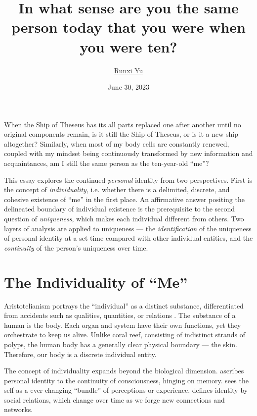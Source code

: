\documentclass[a4paper,english,12pt]{scrartcl}
\begin{document}
\subject{2023 John Locke Essay Competition\\Philosophy Question 2}
\title{In what sense are you the same person today that you were when you were ten?}
\author{\href{https://www.andrewyu.org/}{Runxi Yu}}
\date{June 30, 2023}

\maketitle

\noindent When the Ship of Theseus has its all parts replaced one
after another until no original components remain, is it still the
Ship of Theseus, or is it a new ship altogether?  Similarly, when
most of my body cells are constantly renewed, coupled with my mindset
being continuously transformed by new information and acquaintances,
am I still the same person as the ten-year-old ``me''?

This essay explores the continued \emph{personal} identity from two
perspectives. First is the concept of \emph{individuality}, i.e. whether
there is a delimited, discrete, and cohesive existence of ``me''
in the first place. An affirmative answer positing the delineated
boundary of individual existence is the prerequisite to the second
question of \emph{uniqueness}, which makes each individual different
from others. Two layers of analysis are applied to uniqueness
--- the \emph{identification} of the uniqueness of personal identity
at a set time compared with other individual entities, and the \emph{continuity}
of the person's uniqueness over time.

\section{The Individuality of ``Me''}

Aristotelianism portrays the ``individual'' as a distinct substance,
differentiated from accidents such as qualities, quantities, or relations
\parencite{MetaphysicsZeta}. The substance of a human is the body.
Each organ and system have their own functions, yet they orchestrate
to keep us alive. Unlike coral reef, consisting of indistinct strands
of polyps, the human body has a generally clear physical boundary
--- the skin. Therefore, our body is a discrete individual
entity.

The concept of individuality expands beyond the biological dimension.
\textcite{LockeHumanUnderstanding} ascribes personal identity to
the continuity of consciousness, hinging on memory. \textcite{DavidHume} sees the self
as a ever-changing “bundle” of perceptions or experience. \textcite{Mead1934MindSA} defines identity by social relations,
which change over time as we forge new connections and networks.
\end{document}
